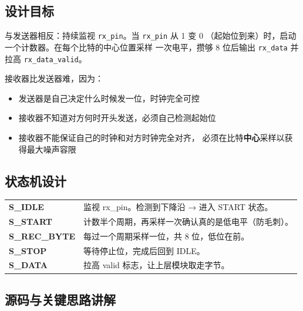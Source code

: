 \subsection{设计目标}

与发送器相反：持续监视 \texttt{rx\_pin}。当 \texttt{rx\_pin} 从 1 变 0
（起始位到来）时，启动一个计数器。在每个比特的中心位置采样
一次电平，攒够 8 位后输出 \texttt{rx\_data} 并拉高 \texttt{rx\_data\_valid}。

接收器比发送器难，因为：
\begin{itemize}
    \item 发送器是自己决定什么时候发一位，时钟完全可控
    \item 接收器不知道对方何时开头发送，必须自己检测起始位
    \item 接收器不能保证自己的时钟和对方时钟完全对齐，
        必须在比特\textbf{中心}采样以获得最大噪声容限
\end{itemize}

\subsection{状态机设计}

\begin{center}
\begin{tabular}{l l}
\textbf{S\_IDLE} & 监视 rx\_pin。检测到下降沿 → 进入 START 状态。 \\
\textbf{S\_START} & 计数半个周期，再采样一次确认真的是低电平（防毛刺）。 \\
\textbf{S\_REC\_BYTE} & 每过一个周期采样一位，共 8 位，低位在前。 \\
\textbf{S\_STOP} & 等待停止位，完成后回到 IDLE。 \\
\textbf{S\_DATA} & 拉高 valid 标志，让上层模块取走字节。 \\
\end{tabular}
\end{center}

\subsection{源码与关键思路讲解}

